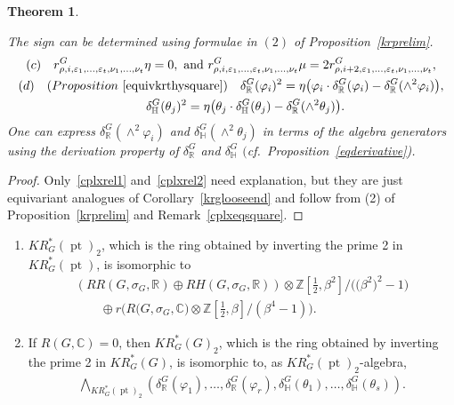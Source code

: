 \documentclass[pdftex]{sigma}
\numberwithin{equation}{section}
\newtheorem{Theorem}{Theorem}[section]
\DeclareMathOperator{\pt}{pt}
\begin{document}
\begin{Theorem}
\begin{enumerate}
The sign can be determined using formulae in $(2)$ of Proposition~{\rm \ref{krprelim}}.
\begin{gather}
\label{cplxrel2}
(c)\quad
r^G_{\rho, i, \varepsilon_1, \dots, \varepsilon_t, \nu_1, \dots, \nu_t}\eta=0,\text{ and }
r^G_{\rho, i, \varepsilon_1,\dots, \varepsilon_t, \nu_1, \dots, \nu_t}\mu
=2r^G_{\rho, i+2, \varepsilon_1, \dots, \varepsilon_t, \nu_1, \dots,\nu_t},
\\
(d)\quad
{\rm (}Proposition~{\rm \ref{equivkrthysquare})}
\quad
\delta_\mathbb{R}^G(\varphi_i)^2
=\eta\big(\varphi_i\cdot\delta_\mathbb{R}^G(\varphi_i)-\delta_\mathbb{R}^G(\wedge^2\varphi_i)\big),
\nonumber
\\
\phantom{(d)\quad}
\delta_\mathbb{H}^G(\theta_j)^2
=\eta\big(\theta_j\cdot\delta_\mathbb{H}^G(\theta_j)-\delta_\mathbb{R}^G(\wedge^2\theta_j)\big).
\nonumber
\end{gather}
One can express $\delta_\mathbb{R}^G(\wedge^2\varphi_i)$ and $\delta_\mathbb{H}^G(\wedge^2\theta_j)$ in terms of the
algebra generators using the derivation property of $\delta_\mathbb{R}^G$ and $\delta_\mathbb{H}^G$
$($cf.\ Proposition~{\rm \ref{eqderivative})}.
\end{enumerate}
\end{Theorem}
\begin{proof}
Only~\eqref{cplxrel1} and~\eqref{cplxrel2} need explanation, but they are just equivariant analogues of
Corollary~\ref{krglooseend} and follow from (2) of Proposition~\ref{krprelim} and Remark~\ref{cplxeqsquare}.
\end{proof}
\begin{Remark}{\samepage\quad
\begin{enumerate}\itemsep=0pt
\item
$KR^*_G(\pt)_2$, which is the ring obtained by inverting the prime 2 in $KR^*_G(\pt)$, is isomorphic to
\begin{gather*}
(RR(G,\sigma_G, \mathbb{R})\oplus RH(G,
\sigma_G, \mathbb{R}))\otimes\mathbb{Z}\left[\tfrac{1}{2}, \beta^2\right]/\big(\big(\beta^2\big)^2-1\big)
\\
\qquad{}
\oplus r\big(R\big(G,\sigma_G, \mathbb{C}\big)
\otimes\mathbb{Z}\left[\tfrac{1}{2}, \beta\right]/(\beta^4-1)\big).
\end{gather*}
\item
If $R(G, \mathbb{C})=0$, then $KR^*_G(G)_2$, which is the ring obtained by inverting the prime 2 in $KR^*_G(G)$, is
isomorphic to, as $KR^*_G(\pt)_2$-algebra,
\begin{gather*}
\bigwedge\nolimits_{KR^*_G(\pt)_2}\left(\delta_\mathbb{R}^G(\varphi_1), \dots, \delta_\mathbb{R}^G(\varphi_r),
\delta_\mathbb{H}^G(\theta_1), \dots, \delta_\mathbb{H}^G(\theta_s)\right).
\end{gather*}
\end{enumerate}}
\end{Remark}
\end{document}
